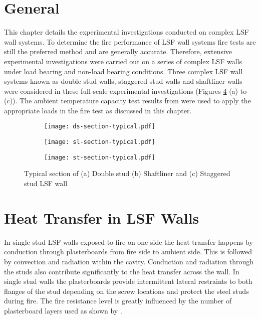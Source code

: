 \section{General}
This chapter details the experimental investigations conducted on complex LSF wall systems. To determine the fire performance of LSF wall systems fire tests are still the preferred method and are generally accurate. Therefore, extensive experimental investigations were carried out on a series of complex LSF walls under load bearing and non-load bearing conditions. Three complex LSF wall systems known as double stud walls, staggered stud walls and shaftliner walls were considered in these full-scale experimental investigations (Figures \ref{fig:typical-complex-section} (a) to (c)). The ambient temperature capacity test results from  were used to apply the appropriate loads in the fire test as discussed in this chapter.
\begin{figure}[!htbp]
	\centering
	\begin{subfigure}[b]{0.5\textwidth}
		\centering
		\texttt{[image: ds-section-typical.pdf]}
		\caption{}
		\label{subfig:ds-section}
	\end{subfigure}
	\begin{subfigure}[b]{0.5\textwidth}
		\centering
		\texttt{[image: sl-section-typical.pdf]}
		\caption{}
		\label{subfig:sl-section}
	\end{subfigure}
	\begin{subfigure}[b]{0.6\textwidth}
		\centering
		\texttt{[image: st-section-typical.pdf]}
		\caption{}
		\label{subfig:st-section}
	\end{subfigure}
	   \caption{Typical section of (a) Double stud (b) Shaftliner and (c) Staggered stud LSF wall}
	   \label{fig:typical-complex-section}
\end{figure}

\section{Heat Transfer in LSF Walls}

In single stud LSF walls exposed to fire on one side the heat transfer happens by conduction through plasterboards from fire side to ambient side. This is followed by convection and radiation within the cavity. Conduction and radiation through the studs also contribute significantly to the heat transfer across the wall. In single stud walls the plasterboards provide intermittent lateral restraints to both flanges of the stud depending on the screw locations and protect the steel studs during fire. The fire resistance level is greatly influenced by the number of plasterboard layers used as shown by \citet{Kodur2006,Ariyanayagam2016}. 

